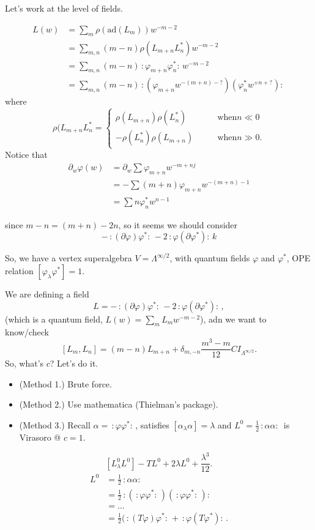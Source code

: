 \medskip\noindent
Let's work at the level of fields.

$$
\begin{aligned}
L(w)&=\sum_m \rho(\text{ad}(L_m)) w^{-m-2}\\
&=\sum_{m,n}(m-n)\rho(L_{m+n}L_n^*)w^{-m-2}\\
&=\sum_{m,n}(m-n)\,:\!\varphi_{m+n}
\varphi^*_n\!:\,w^{-m-2}\\
&=\sum_{m,n}(m-n)\,:\!(\varphi_{m+n}w^{-(m+n)
-?})
(\varphi_n^*w^{+n+?})\!:\,
\end{aligned}
$$
where
$$
\rho(L_{m+n}L_n^* =\begin{cases}
\rho(L_{m+n})\rho(L_n^*)\qquad &\text{when
$n\ll 0$} \\
-\rho(L^*_n)\rho(L_{m+n})\qquad &\text{when
}n\gg 0.
\end{cases}
$$
Notice that
$$
\begin{aligned}
\partial_w\varphi(w)&=\partial_w \sum
\varphi_{m+n}w^{-m+nj}\\
&=-\sum(m+n)\varphi_{m+n}w^{-(m+n)-1}\\
&=\sum n \varphi_n^* w^{n-1}
\end{aligned}
$$

\noindent
since $m-n=(m+n)-2n$,
so it seems we should consider
$$
-\,:\!(\partial \varphi)\varphi^*\!:\,
-2\,:\!\varphi(\partial \varphi^*)\!:\,k
$$

\medskip\noindent
So, we have a vertex superalgebra
$V=\Lambda^{\infty/2}$, with quantum fields
$\varphi$ and $\varphi^*$, OPE relation
$[\varphi_\lambda \varphi^*]=1$.

We are defining a field
$$
L=-\,:\!(\partial \varphi)\varphi^*:\,
-2\,:\!\varphi(\partial \varphi^*)\!:\,,
$$
(which is a quantum field, $L(w)=\sum_m
L_mw^{-m-2}$),
adn we want to know/check
$$
[L_m,L_n]=(m-n)L_{m+n}+\delta_{m,-n}
\frac{m^3-m}{12}CI_{\Lambda^{\infty/2}}.
$$
So, what's $c$? Let's do it.

\begin{itemize}
\item (Method 1.) Brute force.
\item (Method 2.) Use mathematica (Thielman's
package).
\item (Method 3.) Recall $\alpha=\,:\!\varphi
\varphi^*\!:\,$,
satisfies $[\alpha_\lambda \alpha]=\lambda$
and
$L^0=\frac{1}{2}\,:\!\alpha \alpha\!:\,$
is Virasoro @ $c=1$.
\end{itemize}
$$
[L^0_\lambda L^0]-TL^0+2\lambda
L^0+\frac{\lambda^3}{12}.
$$
$$
\begin{aligned}
L^0&=\frac{1}{2}\,:\!\alpha \alpha\!:\,\\
&=\frac{1}{2}
\,:\!(\,:\!\varphi
\varphi^*\!:\,)(\,:\!\varphi
\varphi^*\!:\,)\!:\,\\
&=\ldots\\
&=\frac{1}{2}(\,:\!(T\varphi)\varphi^*\!:\,+
\,:\!\varphi(T\varphi^*)\!:\,.
\end{aligned}
$$

